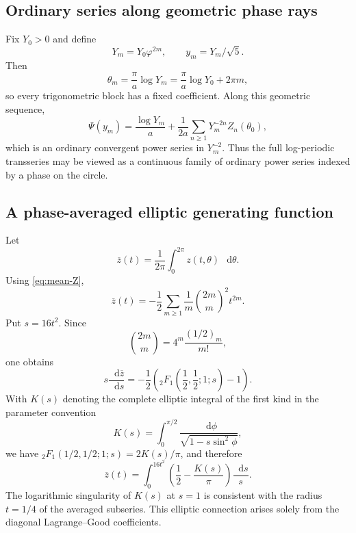 \documentclass[11pt,oneside]{article}
\theoremstyle{plain}
\theoremstyle{definition}
\theoremstyle{remark}
\newcommand{\dd}{\mathop{}\!\mathrm{d}}
\newcommand{\phig}{\varphi}
\begin{document}
\subsection{Ordinary series along geometric phase rays}

Fix \(Y_0>0\) and define
\begin{equation}
 Y_m=Y_0\phig^{2m},
 \qquad y_m=Y_m/\sqrt5.
 \label{eq:phase-ray}
\end{equation}
Then
\begin{equation}
 \theta_m=\frac\pi a\log Y_m
 =\frac\pi a\log Y_0+2\pi m,
 \label{eq:fixed-phase-ray}
\end{equation}
so every trigonometric block has a fixed coefficient.  Along this geometric
sequence,
\begin{equation}
 \Psi(y_m)=\frac{\log Y_m}{a}
 +\frac1{2a}\sum_{n\ge1}Y_m^{-2n}Z_n(\theta_0),
 \label{eq:ordinary-series-ray}
\end{equation}
which is an ordinary convergent power series in \(Y_m^{-2}\).  Thus the full
log-periodic transseries may be viewed as a continuous family of ordinary
power series indexed by a phase on the circle.

\subsection{A phase-averaged elliptic generating function}

Let
\begin{equation}
 \overline z(t)=\frac1{2\pi}\int_0^{2\pi}z(t,\theta)\,\dd\theta.
 \label{eq:z-average}
\end{equation}
Using \eqref{eq:mean-Z},
\begin{equation}
 \overline z(t)
 =-\frac12\sum_{m\ge1}\frac1m
 \binom{2m}{m}^{\!2}t^{2m}.
 \label{eq:z-average-series}
\end{equation}
Put \(s=16t^2\).  Since
\begin{equation}
 \binom{2m}{m}=4^m\frac{(1/2)_m}{m!},
 \label{eq:central-binomial-pochhammer}
\end{equation}
one obtains
\begin{equation}
 s\frac{\dd\overline z}{\dd s}
 =-\frac12\left({}_2F_1\!\left(\frac12,\frac12;1;s\right)-1\right).
 \label{eq:z-average-hypergeometric}
\end{equation}
With \(K(s)\) denoting the complete elliptic integral of the first kind in the
parameter convention
\begin{equation}
 K(s)=\int_0^{\pi/2}\frac{\dd\phi}{\sqrt{1-s\sin^2\phi}},
 \label{eq:elliptic-K}
\end{equation}
we have
\({}_2F_1(1/2,1/2;1;s)=2K(s)/\pi\), and therefore
\begin{equation}
 \boxed{
 \overline z(t)=
 \int_0^{16t^2}\left(\frac12-\frac{K(s)}\pi\right)\frac{\dd s}{s}.}
 \label{eq:z-average-elliptic}
\end{equation}
The logarithmic singularity of \(K(s)\) at \(s=1\) is consistent with the
radius \(t=1/4\) of the averaged subseries.  This elliptic connection arises
solely from the diagonal Lagrange--Good coefficients.
\end{document}
